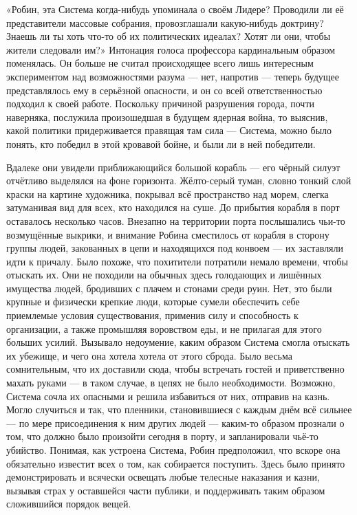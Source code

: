 \documentclass[a4paper,12pt]{book}
\begin{document}
	«Робин, эта Система когда-нибудь упоминала о своём Лидере? Проводили ли её представители массовые собрания, провозглашали какую-нибудь доктрину? Знаешь ли ты хоть что-то об их политических идеалах? Хотят ли они, чтобы жители следовали им?»
	Интонация голоса профессора кардинальным образом поменялась. Он больше не считал происходящее всего лишь интересным экспериментом над возможностями разума — нет, напротив — теперь будущее представлялось ему в серьёзной опасности, и он со всей ответственностью подходил к своей работе. Поскольку причиной разрушения города, почти наверняка, послужила произошедшая в будущем ядерная война, то выяснив, какой политики придерживается правящая там сила — Система, можно было понять, кто победил в этой кровавой бойне, и были ли в ней победители.

	Вдалеке они увидели приближающийся большой корабль — его чёрный силуэт отчётливо выделялся на фоне горизонта. Жёлто-серый туман, словно тонкий слой краски на картине художника, покрывал всё пространство над морем, слегка затуманивая вид для всех, кто находился на суше. До прибытия корабля в порт оставалось несколько часов.
	Внезапно на территории порта послышались чьи-то возмущённые выкрики, и внимание Робина сместилось от корабля в сторону группы людей, закованных в цепи и находящихся под конвоем — их заставляли идти к причалу. Было похоже, что похитители потратили немало времени, чтобы отыскать их. Они не походили на обычных здесь голодающих и лишённых имущества людей, бродивших с плачем и стонами среди руин. Нет, это были крупные и физически крепкие люди, которые сумели обеспечить себе приемлемые условия существования, применив силу и способность к организации, а также промышляя воровством еды, и не прилагая для этого больших усилий. Вызывало недоумение, каким образом Система смогла отыскать их убежище, и чего она хотела хотела от этого сброда. Было весьма сомнительным, что их доставили сюда, чтобы встречать гостей и приветственно махать руками — в таком случае, в цепях не было необходимости. Возможно, Система сочла их опасными и решила избавиться от них, отправив на казнь. Могло случиться и так, что пленники, становившиеся с каждым днём всё сильнее — по мере присоединения к ним других людей — каким-то образом прознали о том, что должно было произойти сегодня в порту, и запланировали чьё-то убийство. Понимая, как устроена Система, Робин предположил, что вскоре она обязательно известит всех о том, как собирается поступить. Здесь было принято демонстрировать и всячески освещать любые телесные наказания и казни, вызывая страх у оставшейся части публики, и поддерживать таким образом сложившийся порядок вещей.
\end{document}
